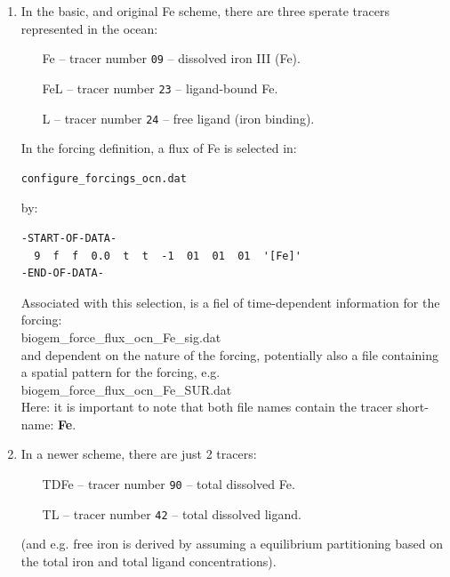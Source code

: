 \documentclass[11pt,fleqn]{book} %
\begin{document}
\begin{enumerate}[noitemsep]

\vspace{1mm}
\item In the basic, and original Fe scheme, there are three sperate tracers represented in the ocean:
\begin{itemize}[noitemsep]
\setlength{\itemindent}{.2in}
\item [Fe]  -- tracer number \texttt{09} -- dissolved iron III (Fe).
\item [FeL] -- tracer number \texttt{23} -- ligand-bound Fe.
\item [L]   -- tracer number \texttt{24} -- free ligand (iron binding).
\end{itemize}
In the forcing definition, a flux of Fe is selected in:
\vspace{-1mm}\small\begin{verbatim}
configure_forcings_ocn.dat
\end{verbatim}\vspace{-1mm}\normalsize
by:
\vspace{-1mm}\small\begin{verbatim}
-START-OF-DATA-
  9  f  f  0.0  t  t  -1  01  01  01  '[Fe]'
-END-OF-DATA-
\end{verbatim}\vspace{-1mm}\normalsize
Associated with this selection, is a fiel of time-dependent information for the forcing:
\\\textsf{\footnotesize biogem\_force\_flux\_ocn\_Fe\_sig.dat}
\\and dependent on the nature of the forcing, potentially also a file containing a spatial pattern for the forcing, e.g.
\\\textsf{\footnotesize biogem\_force\_flux\_ocn\_Fe\_SUR.dat}
\\Here: it is important to note that both file names contain the tracer short-name: \textbf{\textsf{\footnotesize Fe}}.

\vspace{1mm}
\item In a newer scheme, there are just 2 tracers:
\begin{itemize}[noitemsep]
\setlength{\itemindent}{.2in}
\item [TDFe]  -- tracer number \texttt{90} -- total dissolved Fe.
\item [TL] -- tracer number \texttt{42} -- total dissolved ligand.
\end{itemize}
(and e.g. free iron is derived by assuming a equilibrium partitioning based on the total iron and total ligand concentrations).

\end{enumerate}
\end{document}
